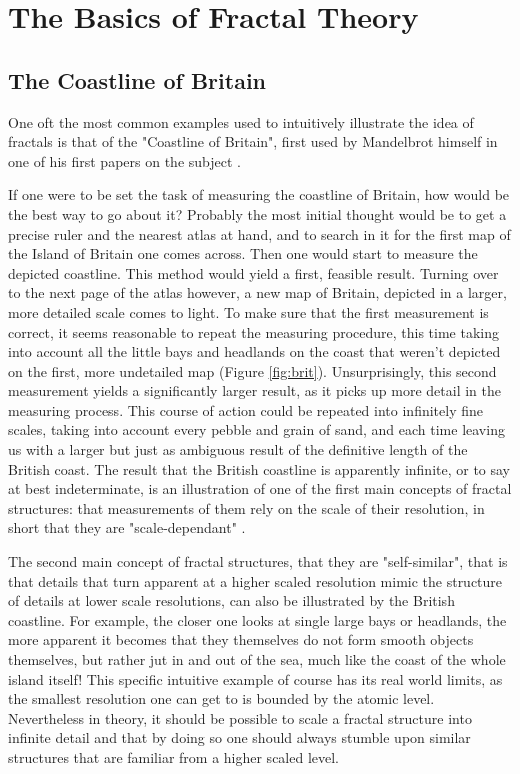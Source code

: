 \documentclass{article}[12pt]
\begin{document}
\section{The Basics of Fractal Theory}

\subsection{The Coastline of Britain}
One oft the most common examples used to intuitively illustrate the idea of fractals is that of the "Coastline of Britain", first used by Mandelbrot himself in one of his first papers on the subject \citep{mandelbrot1967long}.

If one were to be set the task of measuring the coastline of Britain, how would be the best way to go about it? Probably the most initial thought would be to get a precise ruler and the nearest atlas at hand, and to search in it for the first map of the Island of Britain one comes across. Then one would start to measure the depicted coastline. This method would yield a first, feasible result. Turning over to the next page of the atlas however, a new map of Britain, depicted in a larger, more detailed scale comes to light. To make sure that the first measurement is correct, it seems reasonable to repeat the measuring procedure, this time taking into account all the little bays and headlands on the coast that weren't depicted on the first, more undetailed map (Figure \ref{fig:brit}). Unsurprisingly, this second measurement yields a significantly larger result, as it picks up more detail in the measuring process. This course of action could be repeated into infinitely fine scales, taking into account every pebble and grain of sand, and each time leaving us with a larger but just as ambiguous result of the definitive length of the British coast. The result that the British coastline is apparently infinite, or to say at best indeterminate, is an illustration of one of the first main concepts of fractal structures: that measurements of them rely on the scale of their resolution, in short that they are "scale-dependant" \citep{mandelbrot1967long, batty1987urban}.

The second main concept of fractal structures, that they are "self-similar", that is that details that turn apparent at a higher scaled resolution mimic the structure of details at lower scale resolutions, can also be illustrated by the British coastline. For example, the closer one looks at single large bays or headlands, the more apparent it becomes that they themselves do not form smooth objects themselves, but rather jut in and out of the sea, much like the coast of the whole island itself! This specific intuitive example of course has its real world limits, as the smallest resolution one can get to is bounded by the atomic level. Nevertheless in theory, it should be possible to scale a fractal structure into infinite detail and that by doing so one should always stumble upon similar structures that are familiar from a higher scaled level.
\end{document}
